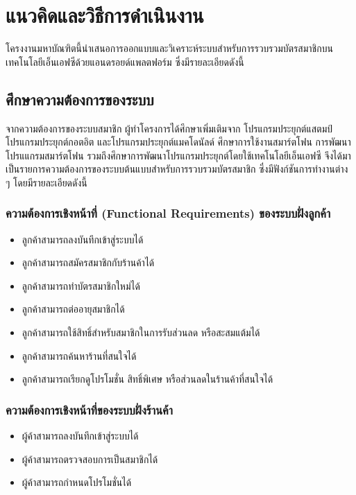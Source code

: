 \documentclass[12pt,a4paper]{article}
\begin{document}
\section{แนวคิดและวิธีการดำเนินงาน}
โครงงานมหาบัณฑิตนี้นําเสนอการออกแบบและวิเคราะห์ระบบสำหรับการรวบรวมบัตรสมาชิกบนเทคโนโลยีเอ็นเอฟซีด้วยแอนดรอยด์แพลตฟอร์ม ซึ่งมีรายละเอียดดังนี้

\subsection{ศึกษาความต้องการของระบบ}
จากความต้องการของระบบสมาชิก ผู้ทำโครงการได้ศึกษาเพิ่มเติมจาก โปรแกรมประยุกต์แสตมป์ โปรแกรมประยุกต์กอตอิต และโปรแกรมประยุกต์แมคโดนัลด์ ศึกษาการใช้งานสมาร์ตโฟน การพัฒนาโปรแแกรมสมาร์ตโฟน รวมถึงศึกษาการพัฒนาโปรแกรมประยุกต์โดยใช้เทคโนโลยีเอ็นเอฟซี จึงได้มาเป็นรายการความต้องการของระบบต้นแบบสำหรับการรวบรวมบัตรสมาชิก ซึ่งมีฟังก์ชันการทำงานต่าง ๆ โดยมีรายละเอียดดังนี้
\subsubsection{ความต้องการเชิงหน้าที่ (Functional Requirements) ของระบบฝั่งลูกค้า}
\begin{itemize}
	\item ลูกค้าสามารถลงบันทึกเข้าสู่ระบบได้
	\item ลูกค้าสามารถสมัครสมาชิกกับร้านค้าได้
	\item ลูกค้าสามารถทำบัตรสมาชิกใหม่ได้
	\item ลูกค้าสามารถต่ออายุสมาชิกได้
	\item ลูกค้าสามารถใช้สิทธิ์สำหรับสมาชิกในการรับส่วนลด หรือสะสมแต้มได้
	\item ลูกค้าสามารถค้นหาร้านที่สนใจได้
	\item ลูกค้าสามารถเรียกดูโปรโมชั่น สิทธิ์พิเศษ หรือส่วนลดในร้านค้าที่สนใจได้
\end{itemize}

\subsubsection{ความต้องการเชิงหน้าที่ของระบบฝั่งร้านค้า}
\begin{itemize}
	\item ผู้ค้าสามารถลงบันทึกเข้าสู่ระบบได้
	\item ผู้ค้าสามารถตรวจสอบการเป็นสมาชิกได้
	\item ผู้ค้าสามารถกำหนดโปรโมชั่นได้
\end{itemize}
\end{document}
